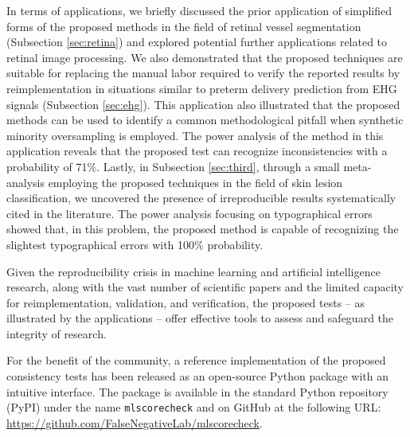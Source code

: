 \documentclass[3p, times]{elsarticle}
\begin{document}
In terms of applications, we briefly discussed the prior application of simplified forms of the proposed methods in the field of retinal vessel segmentation (Subsection \ref{sec:retina}) and explored potential further applications related to retinal image processing. 
We also demonstrated that the proposed techniques are suitable for replacing the manual labor required to verify the reported results by reimplementation in situations similar to preterm delivery prediction from EHG signals (Subsection \ref{sec:ehg}).
This application also illustrated that the proposed methods can be used to identify a common methodological pitfall when synthetic minority oversampling is employed. 
The power analysis of the method in this application reveals that the proposed test can recognize inconsistencies with a probability of 71\%.
Lastly, in Subsection \ref{sec:third}, through a small meta-analysis employing the proposed techniques in the field of skin lesion classification, we uncovered the presence of irreproducible results systematically cited in the literature. The power analysis focusing on typographical errors showed that, in this problem, the proposed method is capable of recognizing the slightest typographical errors with 100\% probability.

Given the reproducibility crisis in machine learning and artificial intelligence research, along with the vast number of scientific papers and the limited capacity for reimplementation, validation, and verification, the proposed tests -- as illustrated by the applications -- offer effective tools to assess and safeguard the integrity of research.

For the benefit of the community, a reference implementation of the proposed consistency tests has been released as an open-source Python package with an intuitive interface. The package is available in the standard Python repository (PyPI) under the name \verb|mlscorecheck| \cite{mlscorecheck} and on GitHub at the following URL: \url{https://github.com/FalseNegativeLab/mlscorecheck}.

% 



\end{document}
